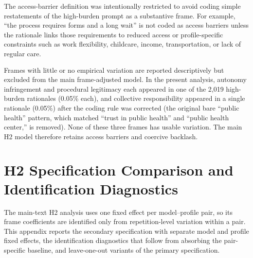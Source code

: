 The access-barrier definition was intentionally restricted to avoid coding simple restatements of the high-burden prompt as a substantive frame. For example, ``the process requires forms and a long wait'' is not coded as access barriers unless the rationale links those requirements to reduced access or profile-specific constraints such as work flexibility, childcare, income, transportation, or lack of regular care.

Frames with little or no empirical variation are reported descriptively but excluded from the main frame-adjusted model. In the present analysis, autonomy infringement and procedural legitimacy each appeared in one of the 2,019 high-burden rationales (0.05\% each), and collective responsibility appeared in a single rationale (0.05\%) after the coding rule was corrected (the original bare ``public health'' pattern, which matched ``trust in public health'' and ``public health center,'' is removed). None of these three frames has usable variation. The main H2 model therefore retains access barriers and coercive backlash.

\clearpage   %
\section{H2 Specification Comparison and Identification Diagnostics}
\label{app:h2-identification}
\label{app:h2-robustness}

The main-text H2 analysis uses one fixed effect per model--profile pair, so its frame coefficients are identified only from repetition-level variation within a pair. This appendix reports the secondary specification with separate model and profile fixed effects, the identification diagnostics that follow from absorbing the pair-specific baseline, and leave-one-out variants of the primary specification.

